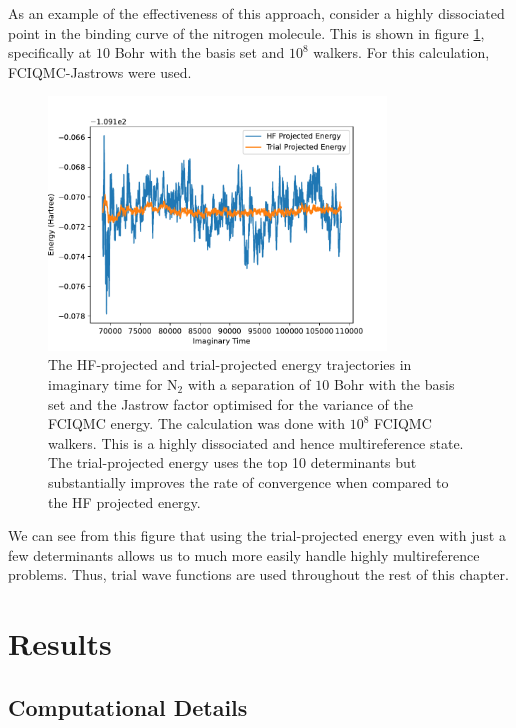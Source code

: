 \endgroup

As an example of the effectiveness of this approach, consider a highly dissociated point in the binding curve of the nitrogen molecule. This is shown in figure \ref{fig:trial_projected_energy}, specifically at $10$ Bohr with the \avtz basis set and $10^8$ walkers. For this calculation, FCIQMC-Jastrows were used.
\begin{figure}[htbp]
    \centering
    \includegraphics[width=0.8\textwidth]{figures/binding/trial_v_projE.pdf}
    \caption{The HF-projected and trial-projected energy trajectories in imaginary time for N$_2$ with a separation of $10$ Bohr with the \avtz basis set and the Jastrow factor optimised for the variance of the FCIQMC energy. The calculation was done with $10^8$ FCIQMC walkers. This is a highly dissociated and hence multireference state. The trial-projected energy uses the top 10 determinants but substantially improves the rate of convergence when compared to the HF projected energy.}
    \label{fig:trial_projected_energy}
\end{figure}
We can see from this figure that using the trial-projected energy even with just a few determinants allows us to much more easily handle highly multireference problems. Thus, trial wave functions are used throughout the rest of this chapter.

\section{Results}
\subsection{Computational Details}

